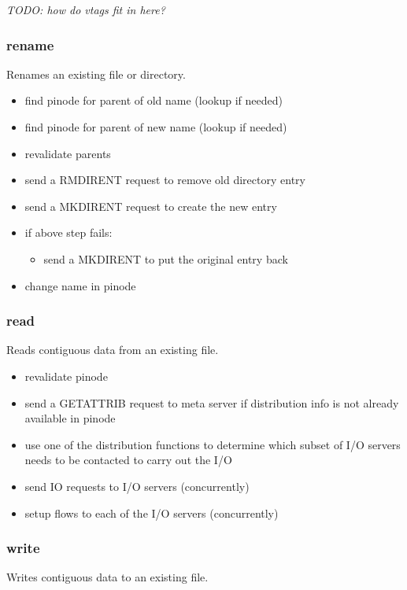 \documentclass[11pt, letterpaper]{article}
\begin{document}
\emph{TODO: how do vtags fit in here?}

\subsubsection{rename}

Renames an existing file or directory.

\begin{itemize}
\item find pinode for parent of old name (lookup if needed)
\item find pinode for parent of new name (lookup if needed)
\item revalidate parents 
\item send a RMDIRENT request to remove old directory entry
\item send a MKDIRENT request to create the new entry
\item if above step fails:
\begin{itemize}
\item send a MKDIRENT to put the original entry back
\end{itemize}
\item change name in pinode
\end{itemize}

\subsubsection{read}

Reads contiguous data from an existing file.  

\begin{itemize}
\item revalidate pinode
\item send a GETATTRIB request to meta server if distribution info is not
already available in pinode
\item use one of the distribution functions to determine which subset of
I/O servers needs to be contacted to carry out the I/O
\item send IO requests to I/O servers (concurrently)
\item setup flows to each of the I/O servers (concurrently)
\end{itemize}

\subsubsection{write}

Writes contiguous data to an existing file. 
\end{document}

